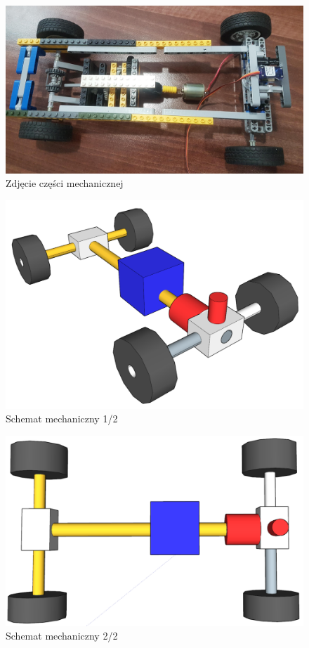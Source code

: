 \documentclass[10pt, a4paper]{article}
\begin{document}
	\begin{figure}[H]
		\centering
		\includegraphics[width=1\textwidth]{figures/20190410_135905.jpg}
		\caption{Zdjęcie części mechanicznej}
		\label{fig:Zdjęcie części mechanicznej}
	\end{figure}
	
		\begin{figure}[H]
		\centering
		\includegraphics[width=1\textwidth]{figures/1.png}
		\caption{Schemat mechaniczny 1/2}
		\label{fig:Schemat mechaniczny}
	\end{figure}
	
		\begin{figure}[H]
		\centering
		\includegraphics[width=1\textwidth]{figures/2.png}
		\caption{Schemat mechaniczny 2/2}
		\label{fig:Schemat mechaniczny}
	\end{figure}
	
\end{document}
